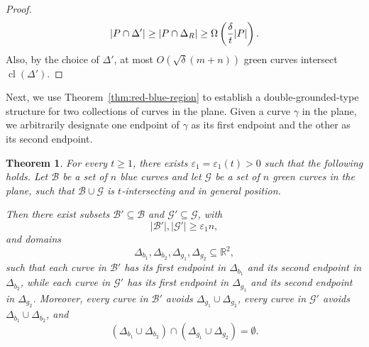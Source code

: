 \documentclass[11pt]{article}
\theoremstyle{plain}
\newtheorem{theorem}{Theorem}[section]
\theoremstyle{definition}
\theoremstyle{remark}
\begin{document}
\begin{proof}
\[
|P\cap\Delta'|
\ge |P\cap\Delta_R|
\ge \Omega\left({\delta\over t}|P|\right).
\]
Also, by the choice of \(\Delta'\), at most \(O(\sqrt\delta(m+n))\) green
curves intersect \(\operatorname{cl}(\Delta')\).

\end{proof}
















Next, we use Theorem~\ref{thm:red-blue-region} to establish a double-grounded-type structure for two collections of curves in the plane.  Given a curve \(\gamma\) in the plane, we arbitrarily designate one endpoint of \(\gamma\) as its first endpoint and the other as its second endpoint.

\medskip


\begin{theorem}\label{thm:doublegrounded}
For every \(t\ge 1\), there exists \(\varepsilon_1=\varepsilon_1(t)>0\) such that the following holds. Let \(\mathcal B\) be a set of \(n\) blue curves and let \(\mathcal G\) be a set of \(n\) green curves in the plane, such that \(\mathcal B\cup\mathcal G\) is $t$-intersecting and in general position.

Then there exist subsets \(\mathcal B'\subseteq \mathcal B\) and \(\mathcal G'\subseteq \mathcal G\), with
\[
|\mathcal B'|,|\mathcal G'|\ge \varepsilon_1 n,
\]
and domains
\[
\Delta_{b_1},\Delta_{b_2},\Delta_{g_1},\Delta_{g_2}\subseteq \mathbb R^2,
\]
such that each curve in \(\mathcal B'\) has its first endpoint in \(\Delta_{b_1}\) and its second endpoint in \(\Delta_{b_2}\), while each curve in \(\mathcal G'\) has its first endpoint in \(\Delta_{g_1}\) and its second endpoint in \(\Delta_{g_2}\). Moreover, every curve in \(\mathcal B'\) avoids \(\Delta_{g_1}\cup\Delta_{g_2}\), every curve in \(\mathcal G'\) avoids \(\Delta_{b_1}\cup\Delta_{b_2}\), and
\[
(\Delta_{b_1}\cup\Delta_{b_2})\cap(\Delta_{g_1}\cup\Delta_{g_2})=\emptyset .
\]
\end{theorem}
\end{document}
